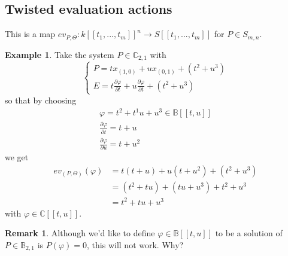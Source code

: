 \documentclass{article}
\theoremstyle{definition}
\newtheorem*{obs}{Remark}
\newtheorem{ex}{Example}
\newcommand{\C}{\mathbb{C}}
\newcommand{\supp}{\text{supp}}
\newcommand{\Sol}{\text{Sol}}
\begin{document}
\subsection{Twisted evaluation actions}
This is a map $ev_{P,\Theta}:k[\![ t_1,...,t_m]\!]^n\to S[\![ t_1,...,t_m]\!]$ for $P\in S_{m,n}$.
\begin{ex}
    Take the system $P\in\C_{2,1}$ with $$\begin{cases}P=tx_{(1,0)}+ux_{(0,1)}+(t^2+u^3)\\ E=t\frac{\partial \varphi}{\partial t}+u\frac{\partial \varphi}{\partial t}+(t^2+u^3)\end{cases}$$ so that by choosing
    \begin{align*}
        \varphi=t^2+t^1u+u^3\in\mathbb B[[t,u]]\\
        \frac{\partial\varphi}{\partial t}=t+u\\
        \frac{\partial\varphi}{\partial u}=t+u^2
    \end{align*}
    we get
    \begin{align*}ev_{(P,\Theta)}(\varphi)&=t(t+u)+u(t+u^2)+(t^2+u^3)\\&=(t^2+tu)+(tu+u^3)+t^2+u^3\\&=t^2+tu+u^3\end{align*}with $\varphi\in\C[[t,u]]$.\par
\end{ex}
   \begin{obs}
       Although we'd like to define $\varphi\in\mathbb B[\![ t,u]\!]$ to be a solution of $P\in\mathbb B_{2,1}$ is $P(\varphi)=0$, this will not work. Why?
   \end{obs}
    
\end{document}
